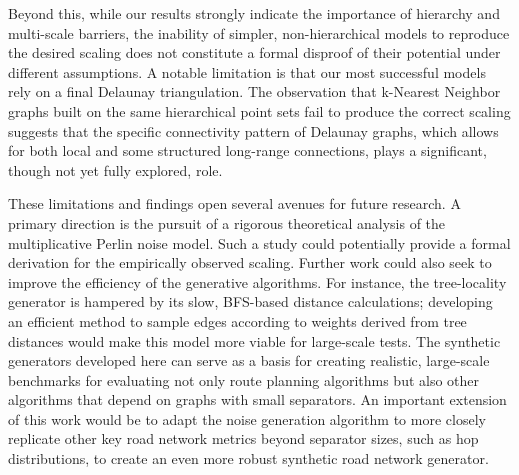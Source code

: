 Beyond this, while our results strongly indicate the importance of hierarchy and multi-scale barriers, the inability of simpler, non-hierarchical models to reproduce the desired scaling does not constitute a formal disproof of their potential under different assumptions.
A notable limitation is that our most successful models rely on a final Delaunay triangulation.
The observation that k-Nearest Neighbor graphs built on the same hierarchical point sets fail to produce the correct scaling suggests that the specific connectivity pattern of Delaunay graphs, which allows for both local and some structured long-range connections, plays a significant, though not yet fully explored, role.

These limitations and findings open several avenues for future research.
A primary direction is the pursuit of a rigorous theoretical analysis of the multiplicative Perlin noise model.
Such a study could potentially provide a formal derivation for the empirically observed  scaling.
Further work could also seek to improve the efficiency of the generative algorithms.
For instance, the tree-locality generator is hampered by its slow, BFS-based distance calculations; developing an efficient method to sample edges according to weights derived from tree distances would make this model more viable for large-scale tests.
The synthetic generators developed here can serve as a basis for creating realistic, large-scale benchmarks for evaluating not only route planning algorithms but also other algorithms that depend on graphs with small separators.
An important extension of this work would be to adapt the noise generation algorithm to more closely replicate other key road network metrics beyond separator sizes, such as hop distributions, to create an even more robust synthetic road network generator.
